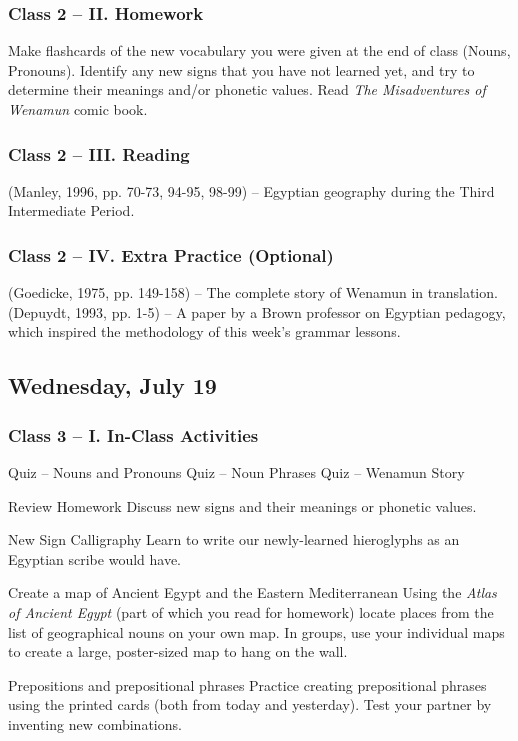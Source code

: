 \documentclass[11pt]{article}
\begin{document}
		\subsubsection*{Class 2 -- II. Homework}
			Make flashcards of the new vocabulary you were given at the end of class (Nouns, Pronouns).
			Identify any new signs that you have not learned yet, and try to determine their meanings and/or phonetic values.
			Read \emph{The Misadventures of Wenamun} comic book.
			
		\subsubsection*{Class 2 -- III. Reading}
			(Manley, 1996, pp. 70-73, 94-95, 98-99) -- Egyptian geography during the Third Intermediate Period.
			
		\subsubsection*{Class 2 -- IV. Extra Practice (Optional)}
			(Goedicke, 1975, pp. 149-158) -- The complete story of Wenamun in translation.\\
			(Depuydt, 1993, pp. 1-5) -- A paper by a Brown professor on Egyptian pedagogy, 
				which inspired the methodology of this week's grammar lessons.
			
	\subsection*{Wednesday, July 19}
		\subsubsection*{Class 3 -- I. In-Class Activities}
			\begin{outline}[itemize]
				\1 Quiz -- Nouns and Pronouns
				\1 Quiz -- Noun Phrases
				\1 Quiz -- Wenamun Story
				
				\1 Review Homework
					\2 Discuss new signs and their meanings or phonetic values.
				
				\1 New Sign Calligraphy
					\2 Learn to write our newly-learned hieroglyphs as an Egyptian scribe would have.
					
				\1 Create a map of Ancient Egypt and the Eastern Mediterranean
					\2 Using the \emph{Atlas of Ancient Egypt} (part of which you read for homework)
						locate places from the list of geographical nouns on your own map.
					\2 In groups, use your individual maps to create a large, poster-sized map to hang on the wall.
				
				\1 Prepositions and prepositional phrases
					\2 Practice creating prepositional phrases using the printed cards (both from today and yesterday).
					\2 Test your partner by inventing new combinations.
					
			\end{outline}
			
\end{document}
